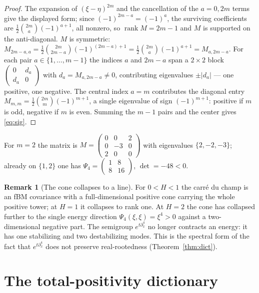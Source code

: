 \documentclass[11pt,reqno]{amsart}
\theoremstyle{plain}
\theoremstyle{definition}
\newtheorem{remark}[theorem]{Remark}
\DeclareMathOperator{\rank}{rank}
\begin{document}
\begin{proof}
The expansion of $(\xi-\eta)^{2m}$ and the cancellation of the $a=0,2m$ terms give
the displayed form; since $(-1)^{2m-a}=(-1)^{a}$, the surviving coefficients are
$\tfrac12\binom{2m}{a}(-1)^{a+1}$, all nonzero, so $\rank M=2m-1$ and $M$ is
supported on the anti-diagonal. $M$ is symmetric: $M_{2m-a,a}
=\tfrac12\binom{2m}{2m-a}(-1)^{(2m-a)+1}=\tfrac12\binom{2m}{a}(-1)^{a+1}=M_{a,2m-a}$.
For each pair $a\in\{1,\dots,m-1\}$ the indices $a$ and $2m-a$ span a
$2\times2$ block $\left(\begin{smallmatrix}0&d_a\\ d_a&0\end{smallmatrix}\right)$
with $d_a=M_{a,2m-a}\neq0$, contributing eigenvalues $\pm|d_a|$ --- one positive,
one negative. The central index $a=m$ contributes the diagonal entry
$M_{m,m}=\tfrac12\binom{2m}{m}(-1)^{m+1}$, a single eigenvalue of sign
$(-1)^{m+1}$: positive if $m$ is odd, negative if $m$ is even. Summing the $m-1$
pairs and the center gives \eqref{eq:sig}.
\end{proof}

For $m=2$ the matrix is
$M=\left(\begin{smallmatrix}0&0&2\\0&-3&0\\2&0&0\end{smallmatrix}\right)$ with
eigenvalues $\{2,-2,-3\}$; already on $\{1,2\}$ one has
$\Psi_4=\left(\begin{smallmatrix}1&8\\8&16\end{smallmatrix}\right)$, $\det=-48<0$.

\begin{remark}[The cone collapses to a line]
For $0<H<1$ the carr\'e du champ is an fBM covariance with a full-dimensional
positive cone carrying the whole positive tower; at $H=1$ it collapses to rank
one. At $H=2$ the cone has collapsed further to
the single energy direction $\Psi_4(\xi,\xi)=\xi^4>0$ against a two-dimensional
negative part. The semigroup $e^{t\partial_x^4}$ no longer contracts an energy: it
has one stabilizing and two destabilizing modes. This is the spectral form of the
fact that $e^{t\partial_x^4}$ does not preserve real-rootedness
(Theorem~\ref{thm:dict}).
\end{remark}

\section{The total-positivity dictionary}\label{sec:dict}
\end{document}
